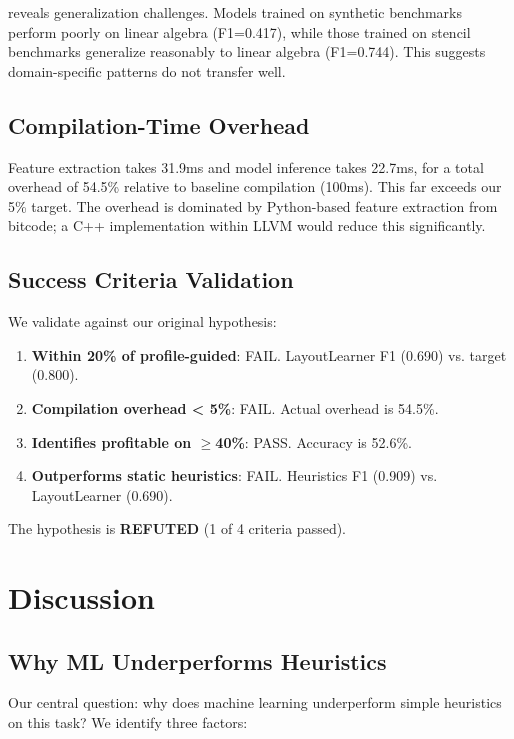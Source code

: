 \documentclass{article}
\begin{document}
 reveals generalization challenges. Models trained on synthetic benchmarks perform poorly on linear algebra (F1=0.417), while those trained on stencil benchmarks generalize reasonably to linear algebra (F1=0.744). This suggests domain-specific patterns do not transfer well.

\subsection{Compilation-Time Overhead}

Feature extraction takes 31.9ms and model inference takes 22.7ms, for a total overhead of 54.5\% relative to baseline compilation (100ms). This far exceeds our 5\% target. The overhead is dominated by Python-based feature extraction from bitcode; a C++ implementation within LLVM would reduce this significantly.

\subsection{Success Criteria Validation}

We validate against our original hypothesis:
\begin{enumerate}
    \item \textbf{Within 20\% of profile-guided}: FAIL. LayoutLearner F1 (0.690) vs. target (0.800).
    \item \textbf{Compilation overhead < 5\%}: FAIL. Actual overhead is 54.5\%.
    \item \textbf{Identifies profitable on $\geq$40\%}: PASS. Accuracy is 52.6\%.
    \item \textbf{Outperforms static heuristics}: FAIL. Heuristics F1 (0.909) vs. LayoutLearner (0.690).
\end{enumerate}

The hypothesis is \textbf{REFUTED} (1 of 4 criteria passed).

\section{Discussion}
\label{sec:discussion}

\subsection{Why ML Underperforms Heuristics}

Our central question: why does machine learning underperform simple heuristics on this task? We identify three factors:
\end{document}
